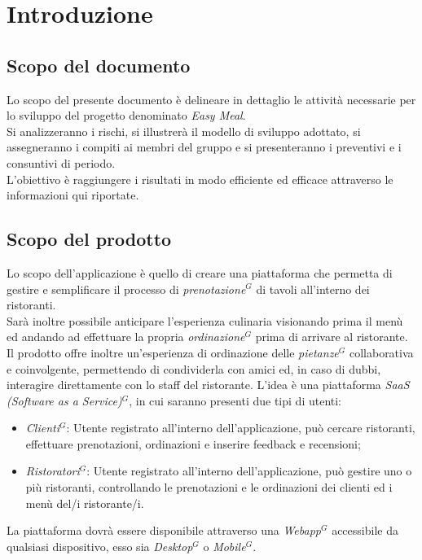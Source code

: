 \section{Introduzione}
\subsection{Scopo del documento}
Lo scopo del presente documento è delineare in dettaglio le attività necessarie per lo sviluppo del progetto denominato \emph{Easy Meal}.\\
Si analizzeranno i rischi, si illustrerà il modello di sviluppo adottato, si assegneranno i compiti ai membri del gruppo e si presenteranno i preventivi e i consuntivi di periodo.\\
L'obiettivo è raggiungere i risultati in modo efficiente ed efficace attraverso le informazioni qui riportate.
\subsection{Scopo del prodotto}
Lo scopo dell'applicazione è quello di creare una piattaforma che permetta di gestire e semplificare
il processo di \emph{prenotazione}$^{G}$ di tavoli all'interno dei ristoranti. \\
Sarà inoltre possibile anticipare l'esperienza culinaria visionando prima il menù ed
andando ad effettuare la propria \emph{ordinazione}$^{G}$ prima di arrivare al ristorante. \\
Il prodotto offre inoltre un’esperienza di ordinazione delle \emph{pietanze}$^{G}$ collaborativa e coinvolgente,
permettendo di condividerla con amici ed, in caso di dubbi, interagire direttamente con lo staff del ristorante.
L’idea è una piattaforma \emph{SaaS (Software as a Service)}$^{G}$, in cui saranno presenti due tipi di utenti:
\begin{itemize}
    \item \emph{Clienti}$^{G}$: Utente registrato all’interno dell’applicazione, può cercare ristoranti, effettuare prenotazioni, ordinazioni e inserire feedback e recensioni;
    \item \emph{Ristoratori}$^{G}$: Utente registrato all’interno dell’applicazione, può gestire uno o più ristoranti, controllando le prenotazioni e le ordinazioni dei clienti ed i menù del/i ristorante/i.
\end{itemize}
La piattaforma dovrà essere disponibile attraverso una \emph{Webapp}$^{G}$ accessibile da qualsiasi dispositivo, esso sia \emph{Desktop}$^{G}$ o \emph{Mobile}$^{G}$.

